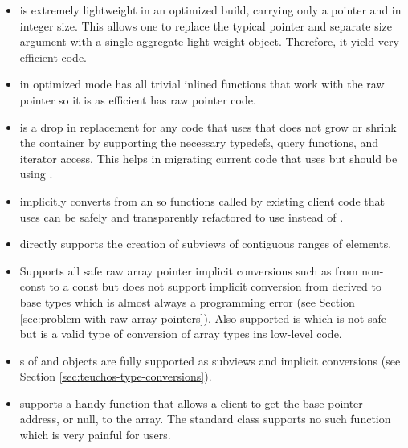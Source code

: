 \documentclass[pdf,ps2pdf,11pt]{SANDreport}
\begin{document}
\begin{itemize}

{}\item{}{} is extremely lightweight in an optimized
build, carrying only a pointer and in integer size.  This allows one
to replace the typical pointer and separate size argument with a
single aggregate light weight object.  Therefore, it yield very
efficient code.

{}\item{} in optimized mode has all trivial inlined
functions that work with the raw pointer so it is as efficient has raw
pointer code.

{}\item{}{} is a drop in replacement for any code
that uses {} that does not grow or shrink the
container by supporting the necessary typedefs, query functions, and
iterator access.  This helps in migrating current code that uses
{} but should be using {}.

{}\item{}{} implicitly converts from an
{} so functions called by existing client code
that uses {} can be safely and transparently
refactored to use {} instead of
{}.

{}\item{} directly supports the creation of subviews
of contiguous ranges of elements.

{}\item{} Supports all safe raw array pointer
implicit conversions such as from non-const to a const but does not
support implicit conversion from derived to base types which is almost
always a programming error (see Section
{}\ref{sec:problem-with-raw-array-pointers}).  Also supported is
{} which is not safe but is a valid type of
conversion of array types ins low-level code.

{}\item{}s of {} and
{} objects are fully supported as subviews and
implicit conversions (see Section
{}\ref{sec:teuchos-type-conversions}).

{}\item{} supports a handy {}
function that allows a client to get the base pointer address, or
null, to the array.  The standard {} class
supports no such function which is very painful for users.

\end{itemize}
\end{document}

